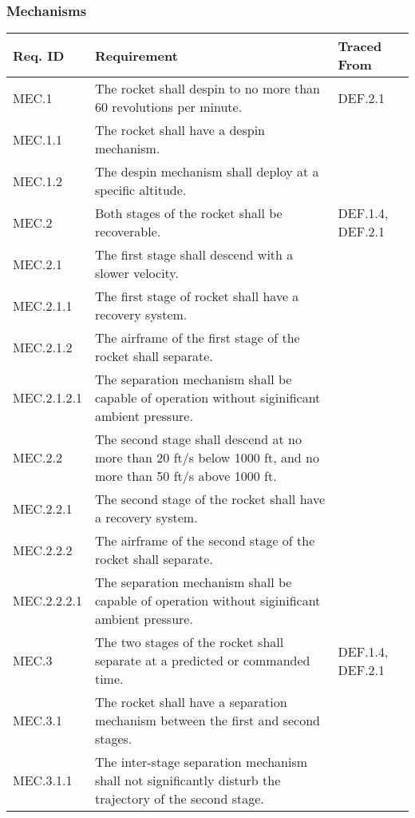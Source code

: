 \subsubsection{Mechanisms}
\begin{table}[htbp] 
    \centering
    \footnotesize 
    \setlength{\tymin}{40pt}
    \let\raggedright\RaggedRight
    
    \begin{tabulary}{\textwidth}{@{}LLL@{}}
    \toprule
        \textbf{Req. ID} & \textbf{Requirement} & \textbf{Traced From} \\
    \midrule
        MEC.1 & The rocket shall despin to no more than 60 revolutions per minute. & DEF.2.1 \\
        MEC.1.1 & The rocket shall have a despin mechanism. &  \\
        MEC.1.2 & The despin mechanism shall deploy at a specific altitude. &  \\
    \midrule
        MEC.2 & Both stages of the rocket shall be recoverable. & DEF.1.4, DEF.2.1 \\  %
        MEC.2.1 & The first stage shall descend with a slower velocity. &  \\
        MEC.2.1.1 & The first stage of rocket shall have a recovery system. &  \\
        MEC.2.1.2 & The airframe of the first stage of the rocket shall separate. &  \\
        MEC.2.1.2.1 & The separation mechanism shall be capable of operation without siginificant ambient pressure. &  \\
        MEC.2.2 & The second stage shall descend at no more than 20 ft/s below 1000 ft, and no more than 50 ft/s above 1000 ft. &  \\
        MEC.2.2.1 & The second stage of the rocket shall have a recovery system. &  \\
        MEC.2.2.2 & The airframe of the second stage of the rocket shall separate. &  \\
        MEC.2.2.2.1 & The separation mechanism shall be capable of operation without siginificant ambient pressure. &  \\
    \midrule
        MEC.3 & The two stages of the rocket shall separate at a predicted or commanded time. & DEF.1.4, DEF.2.1 \\
        MEC.3.1 & The rocket shall have a separation mechanism between the first and second stages. &  \\
        MEC.3.1.1 & The inter-stage separation mechanism shall not significantly disturb the trajectory of the second stage. &  \\
    \bottomrule
    \end{tabulary}

    \label{table:all-mech-req}
\end{table}


